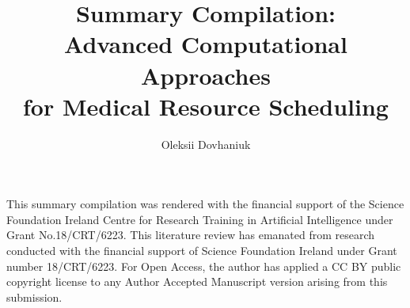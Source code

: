 \title{ 
	Summary Compilation: \\[-.65em]
	Advanced Computational Approaches \\[0.3em] 
	for Medical Resource Scheduling
}
\author{Oleksii Dovhaniuk}

\maketitle
\makedeclaration
\begin{acknowledgements}
	
	This summary compilation was rendered with the financial support of the Science Foundation Ireland Centre for Research Training in Artificial Intelligence under Grant No.18/CRT/6223. This literature review has emanated from research conducted with the financial support of Science Foundation Ireland under Grant number 18/CRT/6223. For Open Access, the author has applied a CC BY public copyright license to any Author Accepted Manuscript version arising from this submission.

\end{acknowledgements}

\setcounter{tocdepth}{2} 


\tableofcontents

